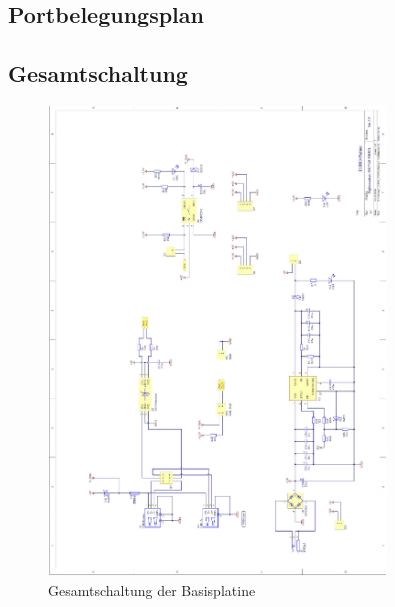 
\subsection{Portbelegungsplan}
\label{sec:basisplatine-portbelegung}

\subsection{Gesamtschaltung}
\label{sec:basisplatine-schaltung}
\begin{figure}[htb]
    \centering
    \includegraphics[width=0.8\textwidth]{Schuh/Pictures/Basis-Schaltung1}
    \caption[Gesamtschaltung der Basisplatine]{Gesamtschaltung der \gls{Basisplatine}}
    \label{fig:basisplatine-schaltung}
\end{figure}
